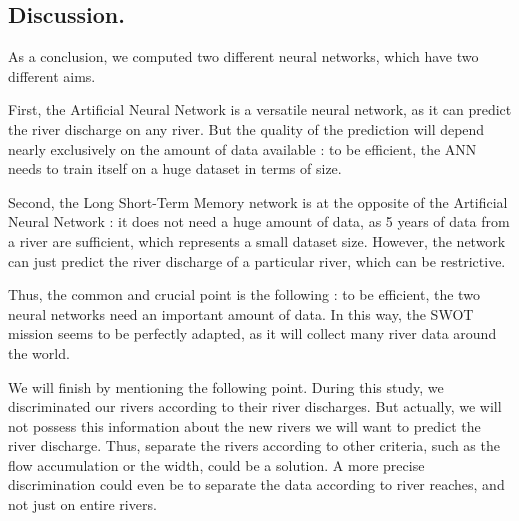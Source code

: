 \subsection{Discussion.}

As a conclusion, we computed two different neural networks, which have two different aims.

First, the Artificial Neural Network is a versatile neural network, as it can predict the river discharge on any river. But the quality of the prediction will depend nearly exclusively on the amount of data available : to be efficient, the ANN needs to train itself on a huge dataset in terms of size.

Second, the Long Short-Term Memory network is at the opposite of the Artificial Neural Network : it does not need a huge amount of data, as 5 years of data from a river are sufficient, which represents a small dataset size. However, the network can just predict the river discharge of a particular river, which can be restrictive.\newline

Thus, the common and crucial point is the following : to be efficient, the two neural networks need an important amount of data. In this way, the SWOT mission seems to be perfectly adapted, as it will collect many river data around the world.\newline

We will finish by mentioning the following point. During this study, we discriminated our rivers according to their river discharges. But actually, we will not possess this information about the new rivers we will want to predict the river discharge. Thus, separate the rivers according to other criteria, such as the flow accumulation or the width, could be a solution. A more precise discrimination could even be to separate the data according to river reaches, and not just on entire rivers.